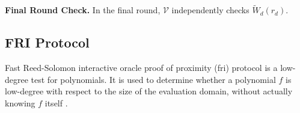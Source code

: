 \noindent\textbf{Final Round Check.}
In the final round, $\mathcal{V}$ independently checks $ \widetilde{W}_{d}(r_{d})$.















\subsection{FRI Protocol}
Fast Reed-Solomon interactive oracle proof of proximity (\gls{fri}) protocol is a low-degree test for polynomials. It is used to determine whether a polynomial $f$ is low-degree with respect to the size of the evaluation domain,  without actually knowing $f$ itself \cite{FRI2018}. 

